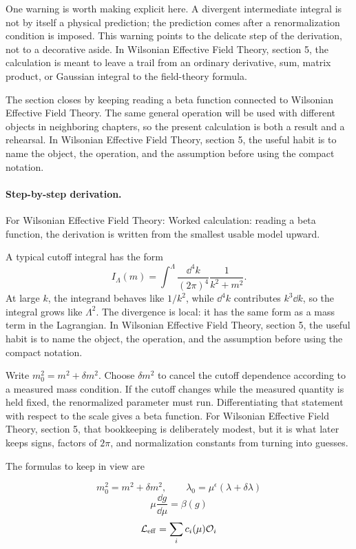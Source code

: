 One warning is worth making explicit here.  A divergent intermediate integral is not by itself a physical prediction; the prediction comes after a renormalization condition is imposed.  This warning points to the delicate step of the derivation, not to a decorative aside.  In Wilsonian Effective Field Theory, section 5, the calculation is meant to leave a trail from an ordinary derivative, sum, matrix product, or Gaussian integral to the field-theory formula.

The section closes by keeping reading a beta function connected to Wilsonian Effective Field Theory.  The same general operation will be used with different objects in neighboring chapters, so the present calculation is both a result and a rehearsal.  In Wilsonian Effective Field Theory, section 5, the useful habit is to name the object, the operation, and the assumption before using the compact notation.



\paragraph{Step-by-step derivation.}

For Wilsonian Effective Field Theory: Worked calculation: reading a beta function, the derivation is written from the smallest usable model upward.

A typical cutoff integral has the form
\[
  I_\Lambda(m)=\int^{\Lambda}\frac{\dd^4k}{(2\pi)^4}\frac{1}{k^2+m^2}.
\]
At large \(k\), the integrand behaves like \(1/k^2\), while \(\dd^4k\) contributes \(k^3\dd k\), so the integral grows like \(\Lambda^2\).  The divergence is local: it has the same form as a mass term in the Lagrangian.  In Wilsonian Effective Field Theory, section 5, the useful habit is to name the object, the operation, and the assumption before using the compact notation.

Write \(m_0^2=m^2+\delta m^2\).  Choose \(\delta m^2\) to cancel the cutoff dependence according to a measured mass condition.  If the cutoff changes while the measured quantity is held fixed, the renormalized parameter must run.  Differentiating that statement with respect to the scale gives a beta function.  For Wilsonian Effective Field Theory, section 5, that bookkeeping is deliberately modest, but it is what later keeps signs, factors of \(2\pi\), and normalization constants from turning into guesses.

The formulas to keep in view are

\[
  m_0^2=m^2+\delta m^2,\qquad \lambda_0=\mu^\epsilon(\lambda+\delta\lambda)
\]
\[
  \mu\frac{\dd g}{\dd\mu}=\beta(g)
\]
\[
  \mathcal L_{\mathrm{eff}}=\sum_i c_i(\mu)\mathcal O_i
\]


